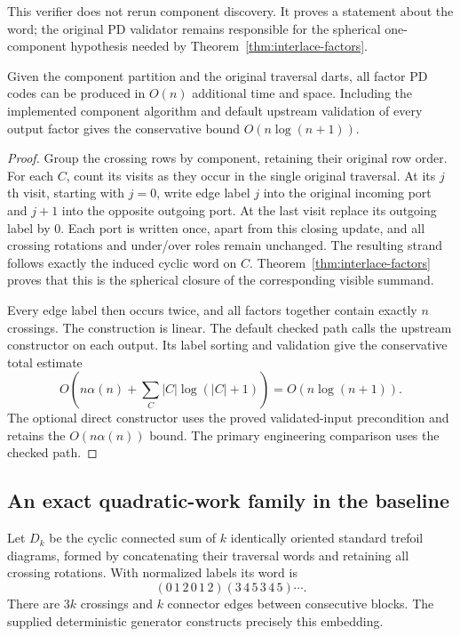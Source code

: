 This verifier does not rerun component discovery.  It proves a statement
about the word; the original PD validator remains responsible for the
spherical one-component hypothesis needed by
Theorem~\ref{thm:interlace-factors}.

\begin{proposition}
\label{prop:interlace-reconstruction}
Given the component partition and the original traversal darts, all factor
PD codes can be produced in $O(n)$ additional time and space.  Including the
implemented component algorithm and default upstream validation of every
output factor gives the conservative bound $O(n\log(n+1))$.
\end{proposition}

\begin{proof}
Group the crossing rows by component, retaining their original row order.
For each $C$, count its visits as they occur in the single original traversal.
At its $j$th visit, starting with $j=0$, write edge label $j$ into the original
incoming port and $j+1$ into the opposite outgoing port.  At the last visit
replace its outgoing label by $0$.  Each port is written once, apart from
this closing update, and all crossing rotations and under/over roles remain
unchanged.  The resulting strand follows exactly the induced cyclic word
on $C$.  Theorem~\ref{thm:interlace-factors} proves that this is the spherical
closure of the corresponding visible summand.

Every edge label then occurs twice, and all factors together contain exactly
$n$ crossings.  The construction is linear.  The default checked path calls
the upstream  constructor on each output.  Its label
sorting and validation give the conservative total estimate
\[
O\!\left(n\alpha(n)+\sum_C |C|\log(|C|+1)\right)
=O(n\log(n+1)).
\]
The optional direct constructor uses the proved validated-input precondition
and retains the $O(n\alpha(n))$ bound.  The primary engineering comparison
uses the checked path.
\end{proof}

\subsection{An exact quadratic-work family in the baseline}

Let $D_k$ be the cyclic connected sum of $k$ identically oriented standard
trefoil diagrams, formed by concatenating their traversal words and retaining
all crossing rotations.  With normalized labels its word is
\[
(0\,1\,2\,0\,1\,2)
(3\,4\,5\,3\,4\,5)\cdots.
\]
There are $3k$ crossings and $k$ connector edges between consecutive blocks.
The supplied deterministic generator constructs precisely this embedding.

